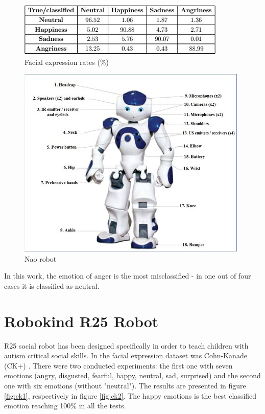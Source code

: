 \documentclass[runningheads,a4paper,12pt]{report}
\begin{document}
\begin{figure}[h]
	\centering
  	\includegraphics[width=0.7\linewidth]{./images/2_nao_table}
  	\caption{Facial expression rates (\%) \cite{nao-emotion}}
  	\label{table:nao}
\end{figure} 

\begin{figure}[h!]
	\centering
  	\includegraphics[width=0.6\linewidth]{./images/2_nao}
  	\caption{Nao robot \cite{nao}}
  	\label{fig:nao}
\end{figure} 

In this work, the emotion of anger is the most misclassified - in one out of four cases it is classified as neutral.

\section{Robokind R25 Robot}
R25 social robot has been designed specifically in order to teach children with autism critical social skills. In \cite{automatic-emotion} the facial expression dataset was Cohn-Kanade (CK+) \cite{ck}. There were two conducted experiments: the first one with seven emotions (angry, disgusted, fearful, happy, neutral, sad, surprised) and the second one with six emotions (without "neutral"). The results are presented in figure \ref{fig:ck1}, respectively in figure \ref{fig:ck2}. The happy emotions is the best classified emotion reaching 100\% in all the tests. 
\end{document}
